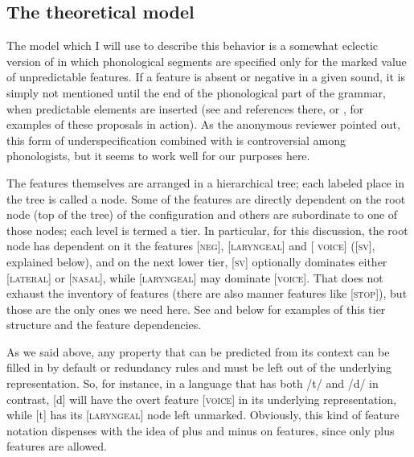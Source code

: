 \documentclass[output=paper]{LSP/langsci}
\begin{document}
\subsection{The theoretical model}

The model which I will use to describe this behavior is a somewhat eclectic version of  in which phonological segments are specified only for the marked value of unpredictable features. If a feature is absent or negative in a given sound, it is simply not mentioned until the end of the phonological part of the grammar, when predictable elements are inserted (see \citealt{Rice1993} and references there, or \citealt{Botma2011}, for examples of these proposals in action). As the anonymous reviewer pointed out, this form of underspecification combined with  is controversial among phonologists, but it seems to work well for our purposes here.

The features themselves are arranged in a hierarchical tree; each labeled place in the tree is called a node. Some of the features are directly dependent on the root node (top of the tree) of the configuration and others are subordinate to one of those nodes; each level is termed a tier. In particular, for this  discussion, the root node has dependent on it the features [\textsc{neg}], [\textsc{laryngeal}] and [\textsc{ voice}] ([\textsc{sv}], explained below), and on the next lower tier, [\textsc{sv}] optionally dominates either [\textsc{lateral}] or [\textsc{nasal}], while [\textsc{laryngeal}] may dominate [\textsc{voice}]. That does not exhaust the inventory of features (there are also manner features like [\textsc{stop}]), but those are the only ones we need here. See  and  below for examples of this tier structure and the feature dependencies.

As we said above, any property that can be predicted from its context can be filled in by default or redundancy rules and must be left out of the underlying representation. So, for instance, in a language that has both /t/ and /d/ in contrast, [d] will have the overt feature [\textsc{voice}] in its underlying representation, while [t] has its [\textsc{laryngeal}] node left unmarked. Obviously, this kind of feature notation dispenses with the idea of plus and minus on features, since only plus features are allowed.
\end{document}
